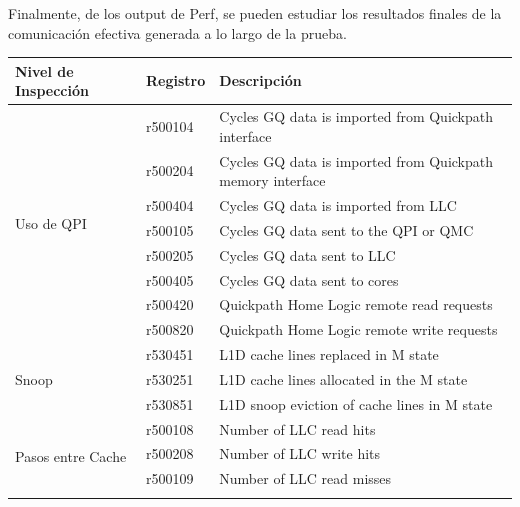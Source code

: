 Finalmente, de los output de Perf, se pueden estudiar los resultados finales de la comunicación efectiva generada a lo largo de la prueba.

\begin{table}[]
\centering
\begin{tabular}{|l|l|l|}
\hline
Nivel de Inspección                 & Registro & Descripción                                                \\ \hline
\multirow{8}{*}{Uso de QPI}         & r500104  & Cycles GQ data is imported from Quickpath interface        \\ \cline{2-3} 
                                    & r500204  & Cycles GQ data is imported from Quickpath memory interface \\ \cline{2-3} 
                                    & r500404  & Cycles GQ data is imported from LLC                        \\ \cline{2-3} 
                                    & r500105  & Cycles GQ data sent to the QPI or QMC                      \\ \cline{2-3} 
                                    & r500205  & Cycles GQ data sent to LLC                                 \\ \cline{2-3} 
                                    & r500405  & Cycles GQ data sent to cores                               \\ \cline{2-3} 
                                    & r500420  & Quickpath Home Logic remote read requests                  \\ \cline{2-3} 
                                    & r500820  & Quickpath Home Logic remote write requests                 \\ \hline
\multirow{3}{*}{Snoop}              & r530451  & L1D cache lines replaced in M state                        \\ \cline{2-3} 
                                    & r530251  & L1D cache lines allocated in the M state                   \\ \cline{2-3} 
                                    & r530851  & L1D snoop eviction of cache lines in M state               \\ \hline
\multirow{15}{*}{Pasos entre Cache} & r500108  & Number of LLC read hits                                    \\ \cline{2-3} 
                                    & r500208  & Number of LLC write hits                                   \\ \cline{2-3} 
                                    & r500109  & Number of LLC read misses                                  \\ \cline{2-3} 

\end{tabular}
\end{table}
